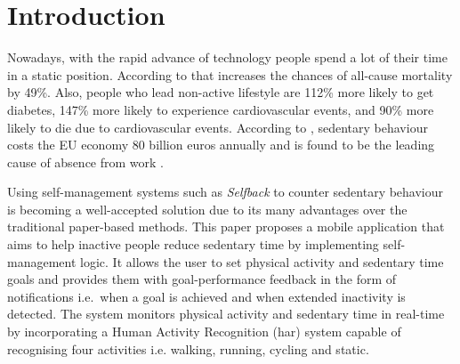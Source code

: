 \chapter{Introduction}
\label{Chapter:Introduction}
Nowadays, with the rapid advance of technology people spend a lot of their time in a static position. According to \citet{wilmot2012} that increases the chances of all-cause mortality by 49\%. Also, people who lead non-active lifestyle are 112\% more likely to get diabetes, 147\% more likely to experience cardiovascular events, and 90\% more likely to die due to cardiovascular events. According to \citet{cerb_2015}, sedentary behaviour costs the EU economy 80 billion euros annually and is found to be the leading cause of absence from work \citep{Wynne-Jonesoemed_2013}.
    
Using self-management systems such as \textit{Selfback} \citep{selfback_2016} to counter sedentary behaviour is becoming a well-accepted solution due to its many advantages over the traditional paper-based methods. This paper proposes a mobile application that aims to help inactive people reduce sedentary time by implementing self-management logic. It allows the user to set physical activity and sedentary time goals and provides them with goal-performance feedback in the form of notifications i.e.\ when a goal is achieved and when extended inactivity is detected. The system monitors physical activity and sedentary time in real-time by incorporating a Human Activity Recognition (\gls{har}) system capable of recognising four activities i.e. walking, running, cycling and static.
    
    
    
